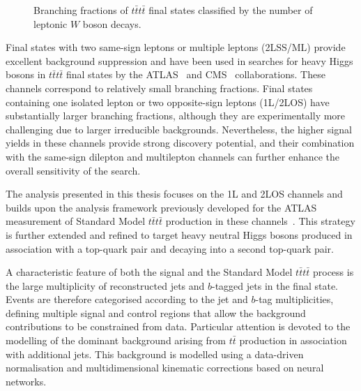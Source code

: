 \begin{figure}[htbp]
\centering
{}
\caption{Branching fractions of $t\bar{t}t\bar{t}$ final states classified by the number of leptonic $W$ boson decays.}
\label{fig:tttt_br}
\end{figure}

Final states with two same-sign leptons or multiple leptons (2LSS/ML) provide
excellent background suppression and have been used in searches for
heavy Higgs bosons in $t\bar{t}t\bar{t}$ final states by the ATLAS~\cite{2023_SSML_4top} and CMS~\cite{CMS-TOP-18-003}
collaborations. These channels correspond to relatively
small branching fractions. Final states containing one isolated lepton
or two opposite-sign leptons (1L/2LOS) have substantially larger branching
fractions, although they are experimentally more challenging due to
larger irreducible backgrounds. Nevertheless, the higher signal yields
in these channels provide strong discovery potential, and their
combination with the same-sign dilepton and multilepton channels can
further enhance the overall sensitivity of the search.

The analysis presented in this thesis focuses on the 1L and 2LOS
channels and builds upon the analysis framework previously developed
for the ATLAS measurement of Standard Model $t\bar{t}t\bar{t}$ production in these channels~\cite{ATLAS:2021kqb}. 
This strategy is further extended and refined to target heavy
neutral Higgs bosons produced in association with a top-quark pair
and decaying into a second top-quark pair.

A characteristic feature of both the signal and the Standard Model
$t\bar{t}t\bar{t}$ process is the large multiplicity of reconstructed jets and
$b$-tagged jets in the final state. Events are therefore categorised
according to the jet and $b$-tag multiplicities, defining multiple
signal and control regions that allow the background contributions to
be constrained from data.
Particular attention is devoted to the modelling of the dominant
background arising from $t\bar{t}$ production in association with
additional jets. This background is modelled using a data-driven normalisation and
multidimensional kinematic corrections based on neural networks.

